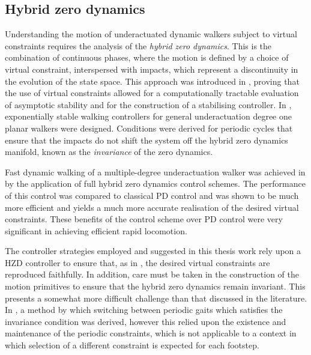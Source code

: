 \subsection{Hybrid zero dynamics}
Understanding the motion of underactuated dynamic walkers subject to virtual constraints requires the analysis of the \textit{hybrid zero dynamics}. This is the combination of continuous phases, where the motion is defined by a choice of virtual constraint, interspersed with impacts, which represent a discontinuity in the evolution of the state space. This approach was introduced in \cite{grizzle2001asymptotically}, proving that the use of virtual constraints allowed for a computationally tractable evaluation of asymptotic stability and for the construction of a stabilising controller. In \cite{westervelt2003hybrid}, exponentially stable walking controllers for general underactuation degree one planar walkers were designed. Conditions were derived for periodic cycles that ensure that the impacts do not shift the system off the hybrid zero dynamics manifold, known as the \textit{invariance} of the zero dynamics. 

Fast dynamic walking of a multiple-degree underactuation walker was achieved in \cite{sreenath2011compliant} by the application of full hybrid zero dynamics control schemes. The performance of this control was compared to classical PD control and was shown to be much more efficient and yields a much more accurate realisation of the desired virtual constraints. These benefits of the control scheme over PD control were very significant in achieving efficient rapid locomotion. 

The controller strategies employed and suggested in this thesis work rely upon a HZD controller to ensure that, as in \cite{sreenath2011compliant}, the desired virtual constraints are reproduced faithfully. In addition, care must be taken in the construction of the motion primitives to ensure that the hybrid zero dynamics remain invariant. This presents a somewhat more difficult challenge than that discussed in the literature. In \cite{westervelt2007feedback}, a method by which switching between periodic gaits which satisfies the invariance condition was derived, however this relied upon the existence and maintenance of the periodic constraints, which is not applicable to a context in which selection of a different constraint is expected for each footstep.

